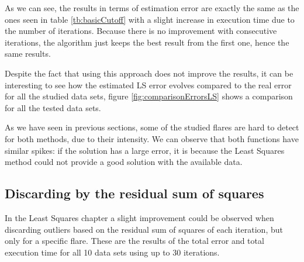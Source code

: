 As we can see, the results in terms of estimation error are exactly the same as the ones seen in table \ref{tb:basicCutoff} with a slight increase in execution time due to the number of iterations. Because there is no improvement with consecutive iterations, the algorithm just keeps the best result from the first one, hence the same results.

Despite the fact that using this approach does not improve the results, it can be interesting to see how the estimated LS error evolves compared to the real error for all the studied data sets, figure \ref{fig:comparisonErrorsLS} shows a comparison for all the tested data sets.


As we have seen in previous sections, some of the studied flares are hard to detect for both methods, due to their intensity. We can observe that both functions have similar spikes: if the solution has a large error, it is because the Least Squares method could not provide a good solution with the available data. 

\subsection{Discarding by the residual sum of squares}

In the Least Squares chapter a slight improvement could be observed when discarding outliers based on the residual sum of squares of each iteration, but only for a specific flare. These are the results of the total error and total execution time for all 10 data sets using up to 30 iterations.

